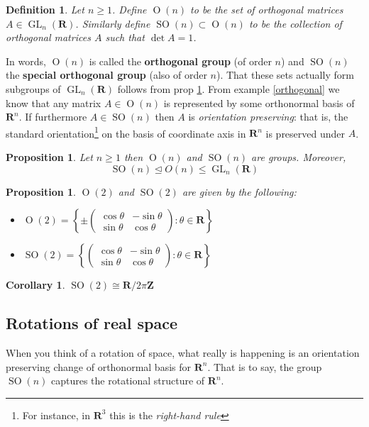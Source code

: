 \documentclass[12pt]{article}
\numberwithin{equation}{subsection}
\newtheorem{prop}[subsection]{Proposition}
\newtheorem{defn}[subsection]{Definition}
\newtheorem{corollary}[subsection]{Corollary}
\theoremstyle{note}
\newcommand{\GL}{\operatorname{GL}}
\newcommand{\Or}{\operatorname{O}}
\newcommand{\SO}{\operatorname{SO}}
\newcommand{\nrml}{\trianglelefteq}
\begin{document}
\begin{defn} 
Let $n\geq 1$. Define $\Or(n)$ to be the set of orthogonal matrices $A\in \GL_n(\mathbf{R})$. Similarly define $\SO(n)\subset \Or(n)$ to be the collection of orthogonal matrices $A$ such that $\det A=1$. 
\end{defn}

In words, $\Or(n)$ is called the \textbf{orthogonal group} (of order $n$) and $\SO(n)$ the \textbf{special orthogonal group} (also of order $n$). That these sets actually form subgroups of $\GL_n(\mathbf{R})$ follows from prop \ref{On-group}. From example \ref{orthogonal} we know that any matrix $A\in \Or(n)$ is represented by some orthonormal basis of $\mathbf{R}^n$. If furthermore $A\in \SO(n)$ then $A$ is \textit{orientation preserving}: that is, the standard orientation\footnote{For instance, in $\mathbf{R}^3$ this is the \textit{right-hand rule}} on the basis of coordinate axis in $\mathbf{R}^n$ is preserved under $A$.

\begin{prop}\label{On-group}
	Let $n\geq 1$ then $\Or(n)$ and $\SO(n)$ are groups. Moreover, \[\SO(n)\nrml O(n)\leq \GL_n(\mathbf{R})\]
\end{prop}

\begin{prop} $\Or(2)$ and $\SO(2)$ are given by the following:	\begin{itemize}
	\item $\Or(2)=\left\{ \pm \begin{pmatrix} \cos\theta & -\sin\theta \\ \sin\theta & \cos\theta \end{pmatrix} : \theta \in \mathbf{R}\right\}$
	
	\item $\SO(2)=\left\{ \begin{pmatrix} \cos\theta & -\sin\theta \\ \sin\theta & \cos\theta \end{pmatrix} : \theta \in \mathbf{R}\right\}$
	\end{itemize}
\end{prop}

\begin{corollary}
	$\SO(2)\cong \mathbf{R}/2\pi\mathbf{Z}$
\end{corollary}

\subsection{Rotations of real space}
When you think of a rotation of space, what really is happening is an orientation preserving change of orthonormal basis for $\mathbf{R}^n$. That is to say, the group $\SO(n)$ captures the rotational structure of $\mathbf{R}^n$. 
\end{document}
